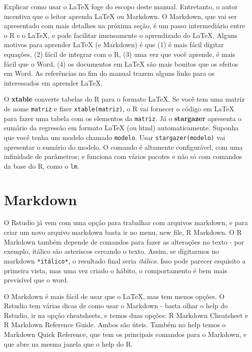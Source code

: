 \documentclass[]{book}
\begin{document}
Explicar como usar o LaTeX foge do escopo deste manual. Entretanto, o
autor incentiva que o leitor aprenda LaTeX ou Markdown. O Markdown, que
vai ser apresentado com mais detalhes na próxima seção, é um passo
intermediário entre o R e o LaTeX, e pode facilitar imensamente o
aprendizado do LaTeX. Alguns motivos para aprender LaTeX (e Markdown) é
que (1) é mais fácil digitar equações, (2) fácil de integrar com o R,
(3) uma vez que você aprende, é mais fácil que o Word, (4) os documentos
em LaTeX são mais bonitos que os efeitos em Word. As referências no fim
do manual trazem alguns links para os interessados em aprender LaTeX.

O \textbf{xtable} converte tabelas do R para o formato LaTeX. Se você
tem uma matriz de nome \texttt{matriz} e fizer \texttt{xtable(matriz)},
o R vai fornecer o código em LaTeX para fazer uma tabela com os
elementos da \texttt{matriz}. Já o \textbf{stargazer} apresenta o
sumário da regressão em formato LaTeX (ou html) automaticamente. Suponha
que você tenha um modelo chamado \texttt{modelo}. Usar
\texttt{stargazer(modelo)} vai apresentar o sumário do modelo. O comando
é altamente configurável, com uma infinidade de parâmetros; e funciona
com vários pacotes e não só com comandos da base do R, como o
\texttt{lm}.

\section{Markdown}\label{markdown}

O Rstudio já vem com uma opção para trabalhar com arquivos markdown, e
para criar um novo arquivo markdown basta ir no menu, new file, R
Markdown. O R Markdown também depende de comandos para fazer as
alterações no texto - por exemplo, itálico são asteriscos cercando o
texto. Assim, se digitarmos no markdown \texttt{*itálico*}, o resultado
final seria \emph{itálico}. Isso pode parecer esquisito a primeira
vista, mas uma vez criado o hábito, o comportamento é bem mais
previsível que o word.

O Markdown é mais fácil de usar que o LaTeX, mas tem menos opções. O
Rstudio tem várias dicas de como usar o Markdown - basta olhar o help do
Rstudio, ir na opção cheatsheets, e temos duas opções: R Markdown
Cheatsheet e R Markdown Reference Guide. Ambos são úteis. Também no help
temos o Markdown Quick Reference, que tem os principais comandos para o
Markdown, e que abre na mesma janela que o help do R.
\end{document}
